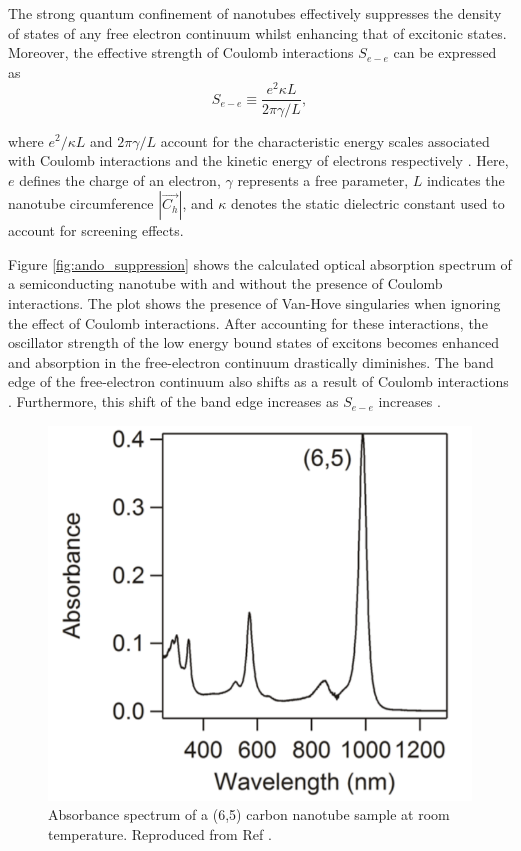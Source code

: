The strong quantum confinement of nanotubes effectively suppresses the density of states of any free electron continuum whilst enhancing that of excitonic states. Moreover, the effective strength of Coulomb interactions $S_{e-e}$ can be expressed as 
\begin{equation}
	S_{e-e} \equiv \dfrac{e^2 \kappa L}{2 \pi \gamma/L},
\end{equation}

where $e^2 /\kappa L$ and $2 \pi \gamma / L$ account for the characteristic energy scales associated with Coulomb interactions and the kinetic energy of electrons respectively \cite{ando2005theory}. Here, $e$ defines the charge of an electron, $\gamma$ represents a free parameter, $L$ indicates the nanotube circumference $|\vec{C_h}|$, and $\kappa$ denotes the static dielectric constant used to account for screening effects.

Figure \ref{fig:ando_suppression} shows the calculated optical absorption spectrum of a semiconducting nanotube with and without the presence of Coulomb interactions. The plot shows the presence of Van-Hove singularies when ignoring the effect of Coulomb interactions. After accounting for these interactions, the oscillator strength of the low energy bound states of excitons becomes enhanced and absorption in the free-electron continuum drastically diminishes. The band edge of the free-electron continuum also shifts as a result of Coulomb interactions \cite{ando1997excitons}. Furthermore, this shift of the band edge increases as $S_{e-e}$ increases \cite{ando2005theory}. 

\begin{figure}[h]
	\centering
	\includegraphics[scale=0.62]{images/chapter_optical_props/cnt_absorbance_yota}
	\caption{Absorbance spectrum of a (6,5) carbon nanotube sample at room temperature. Reproduced from Ref \cite{ichinose2017extraction}. }
	\label{fig:cnt_abs_yota}
\end{figure}

